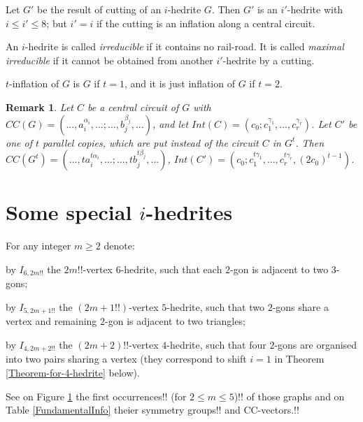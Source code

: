 \documentclass[12pt]{article}
\newtheorem{remark}{Remark}
\begin{document}
Let $G'$ be the result of cutting of an $i$-hedrite $G$. Then $G'$ is an 
$i'$-hedrite with $i\leq i'\leq 8$; but $i'=i$ if the cutting is an 
inflation along a central circuit.


An $i$-hedrite is called {\em irreducible} if it contains no 
rail-road. It is called {\em maximal irreducible} if it cannot be
obtained from another $i'$-hedrite by a cutting.

$t$-inflation of $G$ is $G$ if $t=1$, and it is just inflation of $G$ 
if $t=2$.

\begin{remark}

Let $C$ be a central circuit of $G$ with $CC(G)=(...,a_i^{\alpha_i},...;...,b_j^{\beta_j},...)$,  and let 
$Int(C)=(c_0;c_1^{\gamma_1},...,c_r^{\gamma_r})$. Let $C'$ be one of 
$t$ parallel copies, which are put instead of the circuit $C$ in $G^t$.
Then $CC(G^t)=(...,ta_i^{t\alpha_i},...;...,tb_j^{t\beta_j},...)$,
$Int(C')=(c_0;c_1^{t\gamma_1},...,c_r^{t\gamma_r}, (2c_0)^{t-1})$.
\end{remark}


\section{Some special $i$-hedrites}
For any integer $m \ge 2$ denote:

by $I_{6,2m!!}$ the $2m!!$-vertex $6$-hedrite, such that each $2$-gon is adjacent to two $3$-gons;

by $I_{5,2m+1!!}$ the $(2m+1!!)$-vertex $5$-hedrite, such that 
two $2$-gons share a vertex and remaining $2$-gon is adjacent
to two triangles;

by $I_{4,2m+2!!}$ the $(2m+2)!!$-vertex $4$-hedrite, such that 
four $2$-gons are organised into two pairs sharing a vertex (they correspond to shift $i=1$ in Theorem \ref{Theorem-for-4-hedrite} below).


See on Figure \ref{fig:FamilyIin} the first occurrences!! 
(for $2 \le m \le 5$)!! of those graphs and on Table \ref{FundamentalInfo} theier symmetry groups!!
and CC-vectors.!! 


\begin{figure}
\centering
\epsfxsize=100mm
\label{fig:FamilyIin}
\end{figure}
\end{document}
